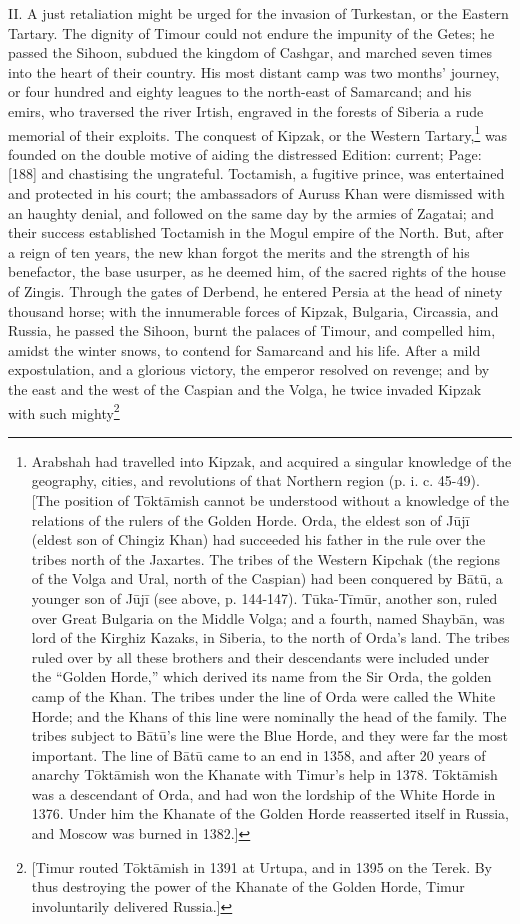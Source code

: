 II. A just retaliation might be urged for the invasion of Turkestan, or the Eastern Tartary. The dignity of Timour could not endure the impunity of the Getes; he passed the Sihoon, subdued the kingdom of Cashgar, and marched seven times into the heart of their country. His most distant camp was two months\texthebrew{}’ journey, or four hundred and eighty leagues to the north-east of Samarcand; and his emirs, who traversed the river Irtish, engraved in the forests of Siberia a rude memorial of their exploits. The conquest of Kipzak, or the Western Tartary,\footnote{Arabshah had travelled into Kipzak, and acquired a singular knowledge of the geography, cities, and revolutions of that Northern region (p. i. c. 45-49). [The position of Tōktāmish cannot be understood without a knowledge of the relations of the rulers of the Golden Horde. Orda, the eldest son of Jūjī (eldest son of Chingiz Khan) had succeeded his father in the rule over the tribes north of the Jaxartes. The tribes of the Western Kipchak (the regions of the Volga and Ural, north of the Caspian) had been conquered by Bātū, a younger son of Jūjī (see above, p. 144-147). Tūka-Tīmūr, another son, ruled over Great Bulgaria on the Middle Volga; and a fourth, named Shaybān, was lord of the Kirghiz Kazaks, in Siberia, to the north of Orda\texthebrew{}’s land. The tribes ruled over by all these brothers and their descendants were included under the \texthebrew{“}Golden Horde,\texthebrew{}” which derived its name from the Sir Orda, the golden camp of the Khan. The tribes under the line of Orda were called the White Horde; and the Khans of this line were nominally the head of the family. The tribes subject to Bātū\texthebrew{}’s line were the Blue Horde, and they were far the most important. The line of Bātū came to an end in 1358, and after 20 years of anarchy Tōktāmish won the Khanate with Timur\texthebrew{}’s help in 1378. Tōktāmish was a descendant of Orda, and had won the lordship of the White Horde in 1376. Under him the Khanate of the Golden Horde reasserted itself in Russia, and Moscow was burned in 1382.]} was founded on the double motive of aiding the distressed Edition: current; Page: [188] and chastising the ungrateful. Toctamish, a fugitive prince, was entertained and protected in his court; the ambassadors of Auruss Khan were dismissed with an haughty denial, and followed on the same day by the armies of Zagatai; and their success established Toctamish in the Mogul empire of the North. But, after a reign of ten years, the new khan forgot the merits and the strength of his benefactor, the base usurper, as he deemed him, of the sacred rights of the house of Zingis. Through the gates of Derbend, he entered Persia at the head of ninety thousand horse; with the innumerable forces of Kipzak, Bulgaria, Circassia, and Russia, he passed the Sihoon, burnt the palaces of Timour, and compelled him, amidst the winter snows, to contend for Samarcand and his life. After a mild expostulation, and a glorious victory, the emperor resolved on revenge; and by the east and the west of the Caspian and the Volga, he twice invaded Kipzak with such mighty\footnote{[Timur routed Tōktāmish in 1391 at Urtupa, and in 1395 on the Terek. By thus destroying the power of the Khanate of the Golden Horde, Timur involuntarily delivered Russia.]} 